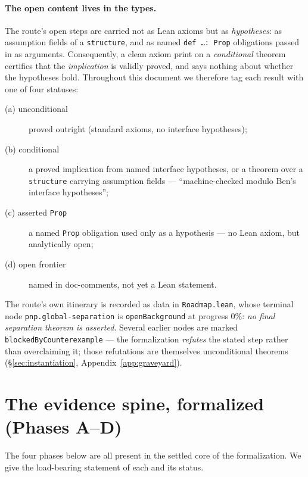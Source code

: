 \documentclass[11pt]{article}
\theoremstyle{definition}
\begin{document}
\paragraph{The open content lives in the types.} The route's open steps are
carried not as Lean axioms but as \emph{hypotheses}: as assumption fields of a
\texttt{structure}, and as named \texttt{def \dots : Prop} obligations passed in as
arguments. Consequently, a clean axiom print on a \emph{conditional} theorem
certifies that the \emph{implication} is validly proved, and says nothing about
whether the hypotheses hold. Throughout this document we therefore tag each result
with one of four statuses:
\begin{description}
  \item[\textnormal{(a) unconditional}] proved outright (standard axioms, no
        interface hypotheses);
  \item[\textnormal{(b) conditional}] a proved implication from named interface
        hypotheses, or a theorem over a \texttt{structure} carrying assumption
        fields --- ``machine-checked modulo Ben's interface hypotheses'';
  \item[\textnormal{(c) asserted \texttt{Prop}}] a named \texttt{Prop} obligation
        used only as a hypothesis --- no Lean axiom, but analytically open;
  \item[\textnormal{(d) open frontier}] named in doc-comments, not yet a Lean
        statement.
\end{description}
The route's own itinerary is recorded as data in \texttt{Roadmap.lean}, whose
terminal node \texttt{pnp.global-separation} is \texttt{openBackground} at
progress $0\%$: \emph{no final separation theorem is asserted}. Several earlier
nodes are marked \texttt{blockedByCounterexample} --- the formalization
\emph{refutes} the stated step rather than overclaiming it; those refutations are
themselves unconditional theorems (\S\ref{sec:instantiation},
Appendix~\ref{app:graveyard}).

\section{The evidence spine, formalized (Phases A--D)}
\label{sec:spine}

The four phases below are all present in the settled core of the formalization. We give the
load-bearing statement of each and its status.
\end{document}
